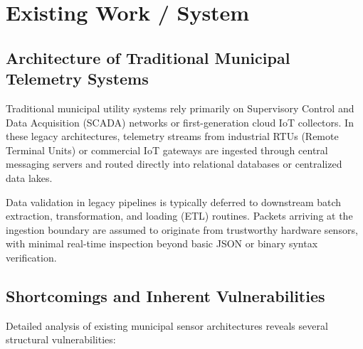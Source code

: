 \section{Existing Work / System}

\subsection{Architecture of Traditional Municipal Telemetry Systems}
Traditional municipal utility systems rely primarily on Supervisory Control and Data Acquisition (SCADA) networks or first-generation cloud IoT collectors. In these legacy architectures, telemetry streams from industrial RTUs (Remote Terminal Units) or commercial IoT gateways are ingested through central messaging servers and routed directly into relational databases or centralized data lakes.

Data validation in legacy pipelines is typically deferred to downstream batch extraction, transformation, and loading (ETL) routines. Packets arriving at the ingestion boundary are assumed to originate from trustworthy hardware sensors, with minimal real-time inspection beyond basic JSON or binary syntax verification.

\subsection{Shortcomings and Inherent Vulnerabilities}
Detailed analysis of existing municipal sensor architectures reveals several structural vulnerabilities:

